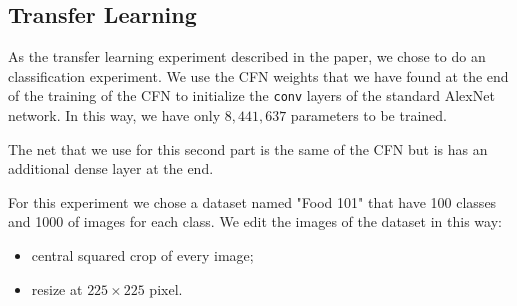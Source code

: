 \subsection{Transfer Learning}
As the transfer learning experiment described in the paper, we chose to do an classification experiment. We use the CFN weights that we have found at the end of the training of the CFN to initialize the \texttt{conv} layers of the standard AlexNet network. In this way, we have only $8,441,637$ parameters to be trained.

The net that we use for this second part is the same of the CFN but is has an additional dense layer at the end.

For this experiment we chose a dataset named "Food 101" \cite{food_images} that have 100 classes and 1000 of images for each class. We edit the images of the dataset in this way:

\begin{itemize}
	\item central squared crop of every image;
	\item resize at $225 \times 225$ pixel.
\end{itemize}